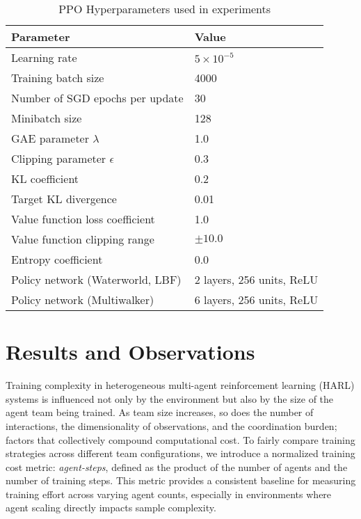 \begin{table}[ht]
    \centering
    \caption{PPO Hyperparameters used in experiments}
    \begin{tabular}{ll}
    \toprule
    \textbf{Parameter} & \textbf{Value} \\
    \midrule
    Learning rate & $5 \times 10^{-5}$ \\
    Training batch size & 4000 \\
    Number of SGD epochs per update & 30 \\
    Minibatch size & 128 \\
    GAE parameter $\lambda$ & 1.0 \\
    Clipping parameter $\epsilon$ & 0.3 \\
    KL coefficient & 0.2 \\
    Target KL divergence & 0.01 \\
    Value function loss coefficient & 1.0 \\
    Value function clipping range & $\pm 10.0$ \\
    Entropy coefficient & 0.0 \\
    Policy network (Waterworld, LBF) & 2 layers, 256 units, ReLU \\%
    Policy network (Multiwalker) & 6 layers, 256 units, ReLU \\%
    \bottomrule
    \end{tabular}
    \label{tab:ppo-hyperparams}
\end{table}

\FloatBarrier
\section{Results and Observations}

Training complexity in heterogeneous multi-agent reinforcement learning (HARL) 
systems is influenced not only by the environment but also by the size of the agent 
team being trained. As team size increases, so does the number of interactions, 
the dimensionality of observations, and the coordination burden; factors that collectively 
compound computational cost. To fairly compare training strategies across different 
team configurations, we introduce a normalized training cost metric: \emph{agent-steps}, 
defined as the product of the number of agents and the number of training steps. 
This metric provides a consistent baseline for measuring training effort across 
varying agent counts, especially in environments where agent scaling directly 
impacts sample complexity.

